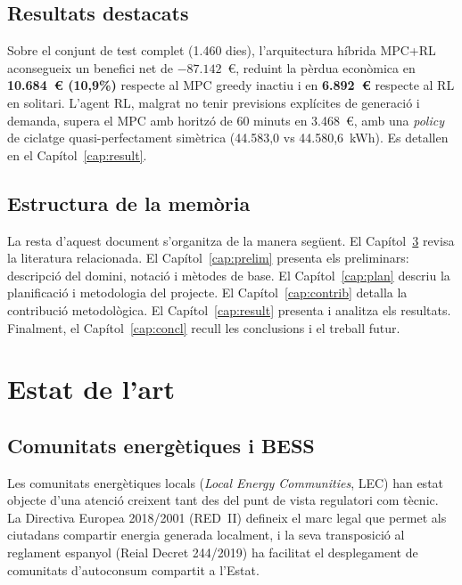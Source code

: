 \documentclass[a4paper,12pt,twoside]{ThesisStyle}
\begin{document}
\section{Resultats destacats}

Sobre el conjunt de test complet (1.460 dies), l'arquitectura híbrida MPC+RL aconsegueix un benefici net de $-87.142$~€, reduint la pèrdua econòmica en \textbf{10.684~€ (10,9\%)} respecte al MPC greedy inactiu i en \textbf{6.892~€} respecte al RL en solitari. L'agent RL, malgrat no tenir previsions explícites de generació i demanda, supera el MPC amb horitzó de 60 minuts en 3.468~€, amb una \textit{policy} de ciclatge quasi-perfectament simètrica (44.583,0 vs 44.580,6~kWh). Es detallen en el Capítol~\ref{cap:result}.

\section{Estructura de la memòria}

La resta d'aquest document s'organitza de la manera següent. El Capítol~\ref{cap:estat} revisa la literatura relacionada. El Capítol~\ref{cap:prelim} presenta els preliminars: descripció del domini, notació i mètodes de base. El Capítol~\ref{cap:plan} descriu la planificació i metodologia del projecte. El Capítol~\ref{cap:contrib} detalla la contribució metodològica. El Capítol~\ref{cap:result} presenta i analitza els resultats. Finalment, el Capítol~\ref{cap:concl} recull les conclusions i el treball futur.


\chapter{Estat de l'art}
\label{cap:estat}

\section{Comunitats energètiques i BESS}

Les comunitats energètiques locals (\textit{Local Energy Communities}, LEC) han estat objecte d'una atenció creixent tant des del punt de vista regulatori com tècnic. La Directiva Europea 2018/2001 (RED~II) defineix el marc legal que permet als ciutadans compartir energia generada localment, i la seva transposició al reglament espanyol (Reial Decret 244/2019) ha facilitat el desplegament de comunitats d'autoconsum compartit a l'Estat.
\end{document}
